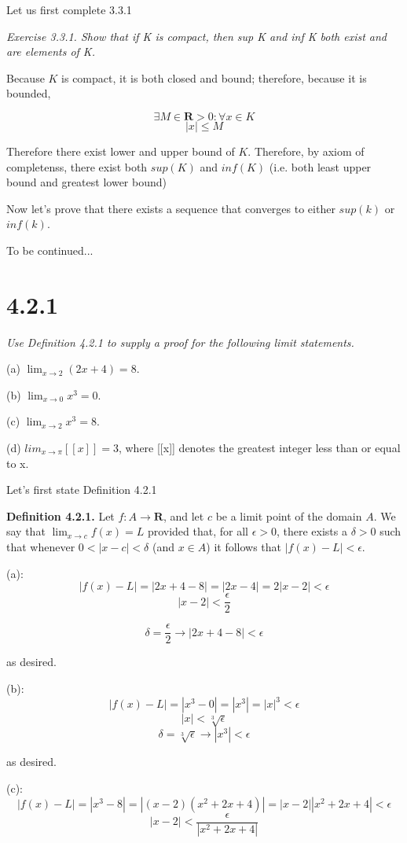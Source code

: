\documentclass[11pt,oneside,titlepage]{article}
\begin{document}
Let us first complete 3.3.1

\textit{Exercise 3.3.1. Show that if K is compact, then sup K and inf K both exist and are elements of K.}

Because $K$ is compact, it is both closed and bound; therefore, because it is bounded,


$$ \exists M \in \textbf{R} > 0 :  \forall x \in K $$
$$ |x| \leq M $$


Therefore there exist lower and upper bound of $K$. Therefore, by axiom of completenss, there exist
both $sup(K)$ and $inf(K)$ (i.e. both least upper bound and greatest lower bound)

Now let's prove that there exists a sequence that converges to either $sup(k)$ or $inf(k)$.

To be continued...


\section*{4.2.1}
\textit{Use Definition 4.2.1 to supply a proof for the following limit statements.}

(a) $\lim_{x \to 2}(2x + 4) = 8$.

(b) $\lim_{x\to0} x^3 = 0$.

(c) $\lim_{x\to2} x^3 = 8$.

(d) $lim_{x\to\pi}[[x]] = 3$, where [[x]] denotes the greatest integer less than or
equal to x.

Let's first state Definition 4.2.1

\textbf{Definition 4.2.1.} Let $f : A \to \textbf{R}$, and let $c$ be a limit point of the domain $A$. We say that $\lim_{x\to c} f(x) = L$ provided that, for all $\epsilon > 0$, there exists
a $\delta > 0$ such that whenever $0 < |x - c| < \delta$ (and $x \in A$) it follows that $|f(x) - L| < \epsilon$.

(a):
$$ |f(x) - L| = |2 x + 4 - 8| = |2 x - 4| = 2|x - 2| < \epsilon $$
$$ |x-2| < \frac{\epsilon}{2}$$

$$  \delta = \frac{\epsilon}{2} \to |2 x + 4 - 8| < \epsilon $$

as desired.

(b):
$$ |f(x) - L| = |x^3 - 0| = |x^3| = |x|^3 < \epsilon $$
$$ |x| < \sqrt[3]{\epsilon}{} $$
$$ \delta = \sqrt[3]{\epsilon} \to |x^3| < \epsilon $$

as desired.

(c):
$$ |f(x) - L| = |x^3 - 8| = |(x - 2)(x^2 + 2x + 4)| = |x-2||x^2 + 2x + 4| < \epsilon $$
$$|x-2| < \frac{\epsilon}{|x^2 + 2x + 4|} $$
\end{document}
